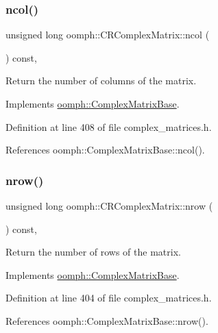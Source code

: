\subsubsection{\texorpdfstring{ncol()}{ncol()}}
{\footnotesize\ttfamily unsigned long oomph\+::\+C\+R\+Complex\+Matrix\+::ncol (\begin{DoxyParamCaption}{ }\end{DoxyParamCaption}) const\hspace{0.3cm}{\ttfamily [inline]}, {\ttfamily [virtual]}}



Return the number of columns of the matrix. 



Implements \hyperlink{classoomph_1_1ComplexMatrixBase_a849b63e50dad36ca8b20b7bdefd34b8d}{oomph\+::\+Complex\+Matrix\+Base}.



Definition at line 408 of file complex\+\_\+matrices.\+h.



References oomph\+::\+Complex\+Matrix\+Base\+::ncol().

\mbox{\label{classoomph_1_1CRComplexMatrix_a08280a10665278ab233777ca7f510345}} 
\subsubsection{\texorpdfstring{nrow()}{nrow()}}
{\footnotesize\ttfamily unsigned long oomph\+::\+C\+R\+Complex\+Matrix\+::nrow (\begin{DoxyParamCaption}{ }\end{DoxyParamCaption}) const\hspace{0.3cm}{\ttfamily [inline]}, {\ttfamily [virtual]}}



Return the number of rows of the matrix. 



Implements \hyperlink{classoomph_1_1ComplexMatrixBase_adcbdf19bc82c61c0a4fbfd8c8de97b3b}{oomph\+::\+Complex\+Matrix\+Base}.



Definition at line 404 of file complex\+\_\+matrices.\+h.



References oomph\+::\+Complex\+Matrix\+Base\+::nrow().

